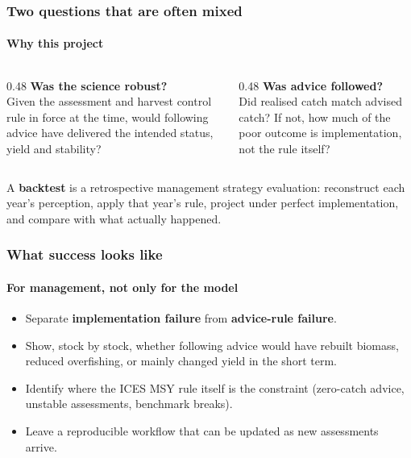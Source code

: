 \documentclass[
  aspectratio=169,
  t,
  onlytextwidth,
  10pt,
]{beamer}
\begin{document}
\begin{frame}
  \frametitle{Two questions that are often mixed}
  \framesubtitle{Why this project}

  \begin{columns}[T]
    \begin{column}{0.48\linewidth}
      \textbf{Was the science robust?}\\[0.4em]
      Given the assessment and harvest control rule in force at the time, would following advice have delivered the intended status, yield and stability?
    \end{column}
    \begin{column}{0.48\linewidth}
      \textbf{Was advice followed?}\\[0.4em]
      Did realised catch match advised catch? If not, how much of the poor outcome is implementation, not the rule itself?
    \end{column}
  \end{columns}

  \vspace{0.8em}
  A \textbf{backtest} is a retrospective management strategy evaluation:
  reconstruct each year's perception, apply that year's rule, project under
  perfect implementation, and compare with what actually happened.
\end{frame}

\begin{frame}
  \frametitle{What success looks like}
  \framesubtitle{For management, not only for the model}

  \begin{itemize}
    \item Separate \textbf{implementation failure} from \textbf{advice-rule failure}.
    \item Show, stock by stock, whether following advice would have rebuilt biomass, reduced overfishing, or mainly changed yield in the short term.
    \item Identify where the ICES MSY rule itself is the constraint (zero-catch advice, unstable assessments, benchmark breaks).
    \item Leave a reproducible workflow that can be updated as new assessments arrive.
  \end{itemize}
\end{frame}
\end{document}
